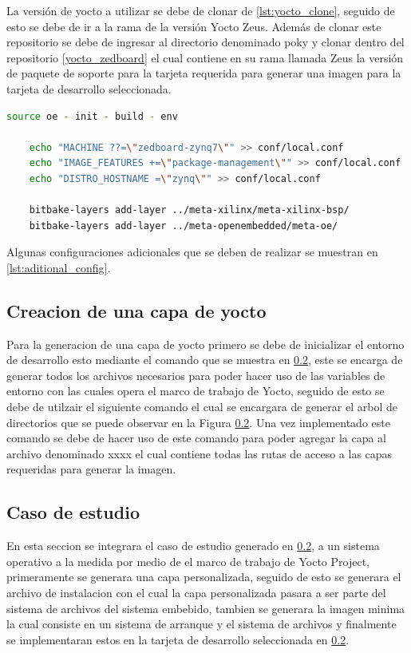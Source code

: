 La versión de yocto a utilizar se debe de clonar de \ref{lst:yocto_clone}, seguido de esto se debe de ir a la rama de la versión Yocto Zeus. Además de clonar este repositorio se debe de ingresar al directorio denominado poky y clonar dentro del repositorio \ref{yocto_zedboard} el cual contiene en su rama llamada Zeus la versión de paquete de soporte para la tarjeta requerida para generar una imagen para la tarjeta de desarrollo seleccionada.

\begin{lstlisting}[language=bash, caption={Configuraciones adicionales}, label=lst:aditional_config]
    source oe - init - build - env
    
    echo "MACHINE ??=\"zedboard-zynq7\"" >> conf/local.conf
    echo "IMAGE_FEATURES +=\"package-management\"" >> conf/local.conf
    echo "DISTRO_HOSTNAME =\"zynq\"" >> conf/local.conf
    
    bitbake-layers add-layer ../meta-xilinx/meta-xilinx-bsp/
    bitbake-layers add-layer ../meta-openembedded/meta-oe/
\end{lstlisting}

Algunas configuraciones adicionales que se deben de realizar se muestran en \ref{lst:aditional_config}.

\subsection{Creacion de una capa de yocto}

Para la generacion de una capa de yocto primero se debe de inicializar el entorno de desarrollo esto mediante el comando que se muestra en \ref{}, este se encarga de generar todos los archivos necesarios para poder hacer uso de las variables de entorno con las cuales opera el marco de trabajo de Yocto, seguido de esto se debe de utilzair el siguiente comando el cual se encargara de generar el arbol de directorios que se puede observar en la Figura \ref{}. Una vez implementado este comando se debe de hacer uso de este comando para poder agregar la capa al archivo denominado xxxx el cual contiene todas las rutas de acceso a las capas requeridas para generar la imagen.

\subsection{Caso de estudio}

En esta seccion se integrara el caso de estudio generado en \ref{}, a un sistema operativo a la medida por medio de el marco de trabajo de Yocto Project, primeramente se generara una capa personalizada, seguido de esto se generara el archivo de instalacion con el cual la capa personalizada pasara a ser parte del sistema de archivos del sistema embebido, tambien se generara la imagen minima la cual consiste en un sistema de arranque y el sistema de archivos y finalmente se implementaran estos en la tarjeta de desarrollo seleccionada en \ref{}.

